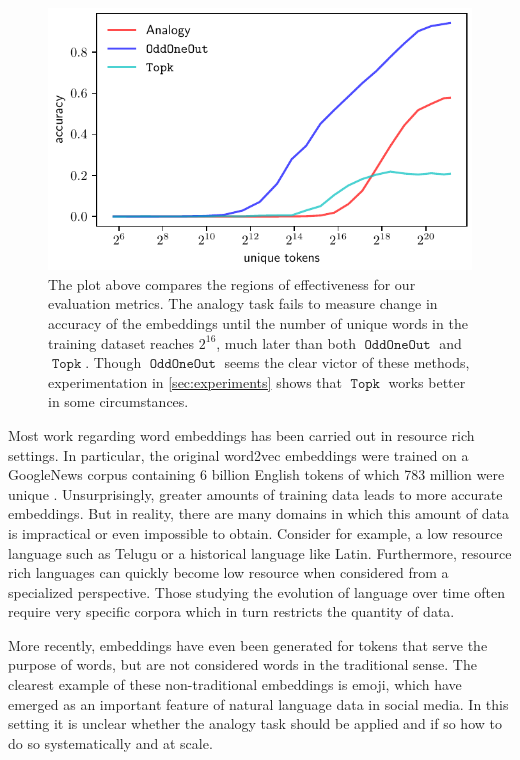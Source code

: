 \documentclass[11pt,a4paper]{article}
\DeclareMathOperator{\OddOneOut}{\texttt{OddOneOut}}
\DeclareMathOperator{\topk}{\texttt{Topk}}
\begin{document}
\begin{figure}
\centering
\includegraphics[width=1\columnwidth]{size_vs_acc.pdf} 
\caption{The plot above compares the regions of effectiveness for our evaluation metrics. 
The analogy task fails to measure change in accuracy of the embeddings until the number of unique words in the training dataset reaches  $2^{16}$, much later than both $\OddOneOut$ and $\topk$. 
Though $\OddOneOut$ seems the clear victor of these methods, experimentation in \ref{sec:experiments} shows that $\topk$ works better in some circumstances.}
\label{fig:size_vs_acc}
\end{figure}


Most work regarding word embeddings has been carried out in resource rich settings. 
In particular, the original word2vec embeddings were trained on a GoogleNews corpus containing 6 billion English tokens of which 783 million were unique \cite{mikolov2013efficient}.
 Unsurprisingly, greater amounts of training data leads to more accurate embeddings.
  But in reality, there are many domains in which this amount of data is impractical or even impossible to obtain. 
  Consider for example, a low resource language such as Telugu or a historical language like Latin.
  Furthermore, resource rich languages can quickly become low resource when considered from a specialized perspective.
   Those studying the evolution of language over time often require very specific corpora which in turn restricts the quantity of data. 

More recently, embeddings have even been generated for tokens that serve the purpose of words, but are not considered words in the traditional sense.
 The clearest example of these non-traditional embeddings is emoji, which have emerged as an important feature of natural language data in social media.
  In this setting it is unclear whether the analogy task should be applied and if so how to do so systematically and at scale.
\end{document}
